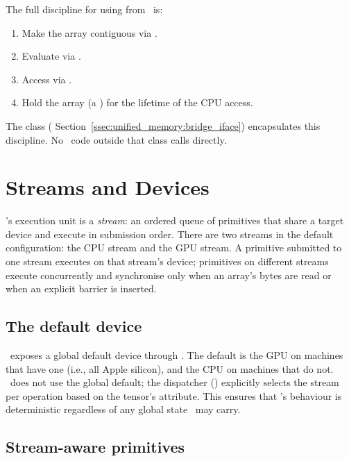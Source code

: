 The full discipline for using  from \Lucid\ is:

\begin{enumerate}
  \item Make the array contiguous via .
  \item Evaluate via .
  \item Access via .
  \item Hold the array (a ) for the
    lifetime of the CPU access.
\end{enumerate}

The  class
( Section~\ref{ssec:unified_memory:bridge_iface})
encapsulates this discipline. No \Lucid\ code outside that class
calls  directly.

\section{Streams and Devices}
\label{sec:mlx_runtime:streams}

\MLX's execution unit is a \emph{stream}: an ordered queue of
primitives that share a target device and execute in submission
order. There are two streams in the default configuration: the CPU
stream and the GPU stream. A primitive submitted to one stream
executes on that stream's device; primitives on different streams
execute concurrently and synchronise only when an array's bytes are
read or when an explicit barrier is inserted.

\subsection{The default device}
\label{ssec:mlx_runtime:default_device}

\MLX\ exposes a global default device through .
The default is the GPU on machines that have one (i.e., all Apple
silicon), and the CPU on machines that do not. \Lucid\ does not use
the global default; the dispatcher ()
explicitly selects the stream per operation based on the tensor's
 attribute. This ensures that \Lucid's behaviour is
deterministic regardless of any global state \MLX\ may carry.

\subsection{Stream-aware primitives}
\label{ssec:mlx_runtime:stream_primitives}

